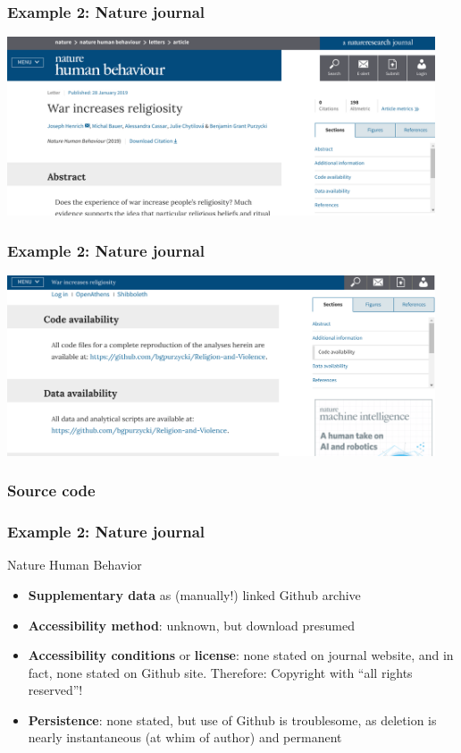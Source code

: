 \begin{frame}
\frametitle{Example 2: Nature journal}
\includegraphics[width=0.95\textwidth]{images/nature-screenshot1.png}
\end{frame}

\begin{frame}
\frametitle{Example 2: Nature journal}
\includegraphics[width=0.95\textwidth]{images/nature-screenshot2.png}
\end{frame}


\begin{frame}
\frametitle{Source code}

\end{frame}

\begin{frame}
\frametitle{Example 2: Nature journal}
\begin{block}{Nature Human Behavior}
\begin{itemize}
\item \textbf{Supplementary data} as (manually!) linked Github archive
\item \textbf{Accessibility method}: unknown, but download presumed
\item \textbf{Accessibility conditions} or \textbf{license}: none stated on journal website, and in fact, none stated on Github site. Therefore: {\color{red}Copyright with ``all rights reserved''}!
\item \textbf{Persistence}: none stated, but use of Github is troublesome, as deletion is nearly instantaneous (at whim of author) and permanent 
\end{itemize}
\end{block}
\end{frame}


